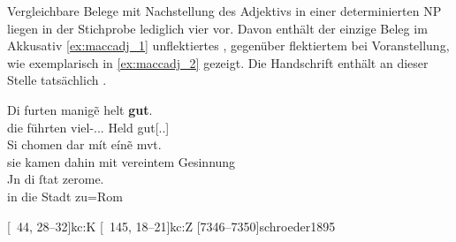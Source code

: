 Vergleichbare Belege mit Nachstellung des Adjektivs in einer determinierten NP
liegen in der Stichprobe lediglich vier vor. Davon enthält der einzige Beleg im
Akkusativ \cref{ex:maccadj_1} unflektiertes  , gegenüber
flektiertem   bei Voranstellung, wie exemplarisch in
\cref{ex:maccadj_2} gezeigt. Die Handschrift \citet{kc:A1} enthält an dieser
Stelle %
tatsächlich  .

\begin{exe}
\ex \label{ex:maccadj}
	\begin{xlist}
	\ex \label{ex:maccadj_1}
		\gll Di furten manigẽ helt \textbf{gut}. \\
			die führten viel-\Acc.\Sg.\MascM.\St{} Held gut[\Acc.\Sg.\MascM] \\
	\sn \gll Si chomen dar mít eínẽ mvt. \\
			sie kamen dahin mit vereintem Gesinnung \\
	\sn \gll Jn di ſtat zerome. \\
			in die Stadt zu=Rom \\
		\begin{taggedline}{\parencites%
			[\pno~55\vb, 20--24]{kc:M}[vgl.]%
			[\pno~31\vb, 27--31]{kc:A1}
			[\pno~43\vb,15--19]{kc:H}
			[\pno~38\va, 18--21]{kc:C1}
			[\pno~44\rb, 28--32]{kc:K}
			[\pno~145\ra, 18--21]{kc:Z}
			[7346--7350]{schroeder1895}
		}
		\trans {}
		\end{taggedline}


\end{xlist}
\end{exe}
